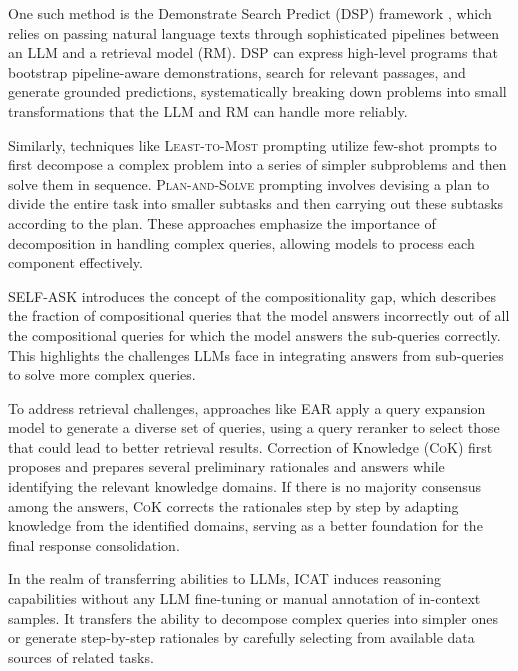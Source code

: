 \documentclass[11pt]{article}
\begin{document}
One such method is the Demonstrate Search Predict (\textsc{DSP}) framework \cite{Demonstrate-Search-Predict}, which relies on passing natural language texts through sophisticated pipelines between an LLM and a retrieval model (RM). \textsc{DSP} can express high-level programs that bootstrap pipeline-aware demonstrations, search for relevant passages, and generate grounded predictions, systematically breaking down problems into small transformations that the LLM and RM can handle more reliably.

Similarly, techniques like \textsc{Least-to-Most} \cite{Least-to-Most} prompting utilize few-shot prompts to first decompose a complex problem into a series of simpler subproblems and then solve them in sequence. \textsc{Plan-and-Solve} \cite{Plan-and-Solve} prompting involves devising a plan to divide the entire task into smaller subtasks and then carrying out these subtasks according to the plan. These approaches emphasize the importance of decomposition in handling complex queries, allowing models to process each component effectively.

\textsc{SELF-ASK} \cite{Self-Ask} introduces the concept of the compositionality gap, which describes the fraction of compositional queries that the model answers incorrectly out of all the compositional queries for which the model answers the sub-queries correctly. This highlights the challenges LLMs face in integrating answers from sub-queries to solve more complex queries.

To address retrieval challenges, approaches like \textsc{EAR} \cite{EAR} apply a query expansion model to generate a diverse set of queries, using a query reranker to select those that could lead to better retrieval results. Correction of Knowledge (\textsc{CoK}) \cite{CoK} first proposes and prepares several preliminary rationales and answers while identifying the relevant knowledge domains. If there is no majority consensus among the answers, \textsc{CoK} corrects the rationales step by step by adapting knowledge from the identified domains, serving as a better foundation for the final response consolidation.

In the realm of transferring abilities to LLMs, \textsc{ICAT} \cite{ICAT} induces reasoning capabilities without any LLM fine-tuning or manual annotation of in-context samples. It transfers the ability to decompose complex queries into simpler ones or generate step-by-step rationales by carefully selecting from available data sources of related tasks.
\end{document}
